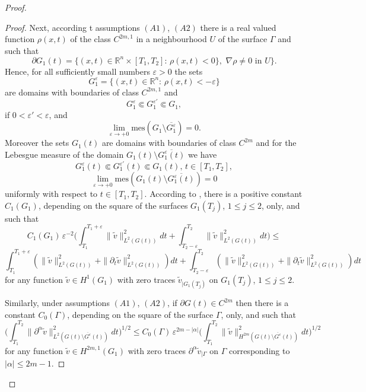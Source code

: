 \documentclass{amsart}
\theoremstyle{definition}
\theoremstyle{remark}
\numberwithin{equation}{section}
\begin{document}
\begin{proof}
\begin{proof}
Next,  according t assumptions $(A1)$, $(A2)$ there is a real valued function 
$\rho (x,t) $ of the class $C^{2m,1}$ in a neighbourhood $U$ of the surface $\Gamma$ 
and such that 
$$
\partial G_1 (t) = \{ (x,t) \in {\mathbb R}^n \times [T_1, T_2]: 
\, \rho (x,t)<0\}, \,\, \nabla \rho \ne 0 \mbox{ in } U 
\} .
$$
Hence, for all sufficiently small numbers $\varepsilon>0$ the sets 
$$
G_1^{\varepsilon} = 
\{ (x,t) \in {\mathbb R}^n: \, \rho (x,t)<-\varepsilon\}
$$
are domains with boundaries of class $C^{2m,1}$ and 
$$
G_1 ^{\varepsilon}\Subset G_1 ^{\varepsilon'}\Subset 
G_1, 
$$
if $0<\varepsilon' <\varepsilon$, and 
$$
\lim_{\varepsilon \to +0}\mbox{mes} (G_1 \setminus 
\overline{G_1  ^{\varepsilon }}) = 0.
$$
Moreover the sets $G_1 (t)$ are domains with boundaries of class $C^{2m}$ and  for the 
Lebesgue measure of the domain  $G_1 (t) \setminus \overline{G_1 ^{\varepsilon} (t) }$ 
we have  
$$
G_1 ^{\varepsilon} (t) \Subset G_1 ^{\varepsilon'} (t)\Subset 
G_1 (t), \, t \in [T_1,T_2],  
$$
$$
\lim_{\varepsilon \to +0}\mbox{mes} (G_1 (t)\setminus 
\overline{G_1  ^{\varepsilon} (t) }) = 0
$$
uniformly with respect to $t\in [T_1,T_2]$. According to \cite[ch. 3, \S 5, lemma 1]{MikhX}, 
there is a positive constant  $C _1 (G_1)$, depending on the square of the surfaces 
$G_1 (T_j) $, $1\leq j\leq 2$, only, and such that 
\begin{equation} \label{eq.est.12}
C_1 (G_1)\, \varepsilon ^{-2}
 \Big(
\int_{T_1}^{T_1+\varepsilon}\| \tilde v \|^2_{L^2 (G (t) )} dt +
\int_{T_2-\varepsilon}^{T_2}\| \tilde v \|^2_{L^2 (G (t) )} dt 
\Big)\leq
\end{equation}
\begin{equation*}  
\int_{T_1}^{T_1+\varepsilon}(\| \tilde v \|^2_{L^2 (G (t) )} +
\| \partial_t \tilde v \|^2_{L^2 (G (t) )} )dt +
\int_{T_2-\varepsilon}^{T_2}(\| \tilde v \|^2_{L^2 (G (t) )} +
\| \partial_t \tilde v \|^2_{L^2 (G (t) )}) dt 
\end{equation*}
for any function $\tilde v \in H^{1} (G_1)$ with zero traces $\tilde v_{|G_1 (T_j)}$
on $G_1 (T_j)$, $1\leq j\leq 2$. 

Similarly, under assumptions $(A1)$, $(A2)$, if  $\partial G(t) \in C^{2m}$ then 
there is a constant  $C _0 (\Gamma)$, depending on the square of the surface 
$ \Gamma$, only, and such that  
\begin{equation} \label{eq.est.11}
\Big(\int_{T_1}^{T_2}\|\partial ^\alpha \tilde v \|^2_{L^2 (G (t) \setminus \overline {G^
\varepsilon}(t))} dt \Big)^{1/2}\leq C_0 (\Gamma)\, \varepsilon  ^{2m-|\alpha|} 
\Big( \int_{T_1}^{T_2} \|\tilde v \|^2_{H^{2m}(G (t) \setminus \overline {G^\varepsilon}(t))} 
dt \Big)^{1/2}
\end{equation}
for any function $\tilde v \in H^{2m,1} (G_1)$ with zero traces 
$\partial^{\alpha}\tilde v_{|\Gamma}$ on $\Gamma$ corresponding to $|\alpha|\leq 2m-1$.


\end{proof}
\end{proof}
\end{document}
